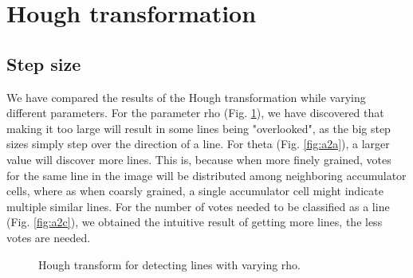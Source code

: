 \documentclass[11pt,a4paper]{article}
\begin{document}
\section{Hough transformation}
\subsection{Step size}
We have compared the results of the Hough transformation while varying different parameters.
For the parameter rho (Fig. \ref{fig:a2b}), we have discovered that making it too large will result in some lines being "overlooked", as the big step sizes simply step over the direction of a line. For theta (Fig. \ref{fig:a2a}), a larger value will discover more lines. This is, because when more finely grained, votes for the same line in the image will be distributed among neighboring accumulator cells, where as when coarsly grained, a single accumulator cell might indicate multiple similar lines. For the number of votes needed to be classified as a line (Fig. \ref{fig:a2c}), we obtained the intuitive result of getting more lines, the less votes are needed.


\begin{figure}%
\centering
{}
\quad
{}
\quad
{}
\quad
\caption{Hough transform for detecting lines with varying rho.}%
\label{fig:a2b}%
\end{figure}
\end{document}

